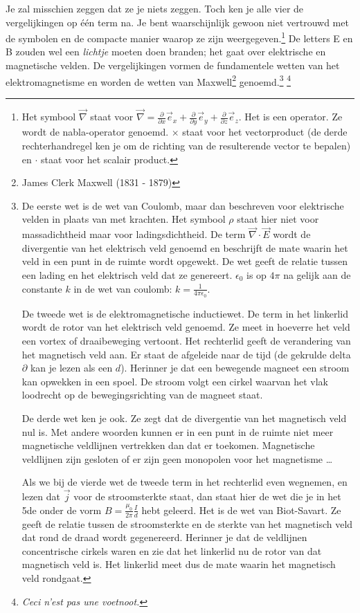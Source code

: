 Je zal misschien zeggen dat ze je niets zeggen. Toch ken je alle vier de vergelijkingen op \'e\'en term na. Je bent waarschijnlijk gewoon niet vertrouwd met de symbolen en de compacte manier waarop ze zijn weergegeven.\footnote{Het symbool $\vec{\nabla}$ staat voor $\vec{\nabla}=\frac{\partial}{\partial x}\vec{e}_x+\frac{\partial}{\partial y}\vec{e}_y+\frac{\partial}{\partial z}\vec{e}_z$. Het is een operator. Ze wordt de nabla-operator genoemd. $\times$ staat voor het vectorproduct (de derde rechterhandregel ken je om de richting van de resulterende vector te bepalen) en $\cdot$ staat voor het scalair product.} De letters E en B zouden wel een \emph{lichtje} moeten doen branden; het gaat over elektrische en magnetische velden. De vergelijkingen vormen de fundamentele wetten van het elektromagnetisme en worden de wetten van Maxwell\footnote{James Clerk Maxwell (1831 - 1879)} genoemd.\footnote{De eerste wet is de wet van Coulomb, maar dan beschreven voor elektrische velden in plaats van met krachten. Het symbool $\rho$ staat hier niet voor massadichtheid maar voor ladingsdichtheid. De term $\vec{\nabla}\cdot\vec{E}$ wordt de divergentie van het elektrisch veld genoemd en beschrijft de mate waarin het veld in een punt in de ruimte wordt opgewekt. De wet geeft de relatie tussen een lading en het elektrisch veld dat ze genereert. $\epsilon_0$ is op $4\pi$ na gelijk aan de constante $k$ in de wet van coulomb: $k=\frac{1}{4\pi\epsilon_0}$.

De tweede wet is de elektromagnetische inductiewet. De term in het linkerlid wordt de rotor van het elektrisch veld genoemd. Ze meet in hoeverre het veld een vortex of draaibeweging vertoont. Het rechterlid geeft de verandering van het magnetisch veld aan. Er staat de afgeleide naar de tijd (de gekrulde delta $\partial$ kan je lezen als een $d$). Herinner je dat een bewegende magneet een stroom kan opwekken in een spoel. De stroom volgt een cirkel waarvan het vlak loodrecht op de bewegingsrichting van de magneet staat. 

De derde wet ken je ook. Ze zegt dat de divergentie van het magnetisch veld nul is. Met andere woorden kunnen er in een punt in de ruimte niet meer magnetische veldlijnen vertrekken dan dat er toekomen. Magnetische veldlijnen zijn gesloten of er zijn geen monopolen voor het magnetisme \ldots

Als we bij de vierde wet de tweede term in het rechterlid even wegnemen, en lezen dat $\vec{j}$ voor de stroomsterkte staat, dan staat hier de wet die je in het 5de onder de vorm $B=\frac{\mu_0}{2\pi}\frac{I}{d}$ hebt geleerd. Het is de wet van Biot-Savart. Ze geeft de relatie tussen de stroomsterkte en de sterkte van het magnetisch veld dat rond de draad wordt gegenereerd. Herinner je dat de veldlijnen concentrische cirkels waren en zie dat het linkerlid nu de rotor van dat magnetisch veld is. Het linkerlid meet dus de mate waarin het magnetisch veld rondgaat.} \footnote{\textit{Ceci n'est pas une voetnoot.}\footnotemark}

